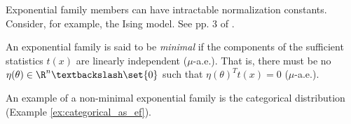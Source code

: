\begin{remark}
Exponential family members can have intractable normalization constants.  Consider, for example,  the Ising model.  See pp. 3 of \cite{taylorXXXXmultiparameter}.
\end{remark}


\begin{definition}
An exponential family is said to be \textit{minimal} if the components of the sufficient statistics $t(x)$ are linearly independent ($\mu$-a.e.).  That is, there must be no $\eta(\theta) \in \R^n \textbackslash \set{0}$ such that $\eta(\theta)^T t(x) = 0$ ($\mu$-a.e.).
\end{definition}

  An example of a non-minimal exponential family is the categorical distribution (Example \ref{ex:categorical_as_ef}). 
